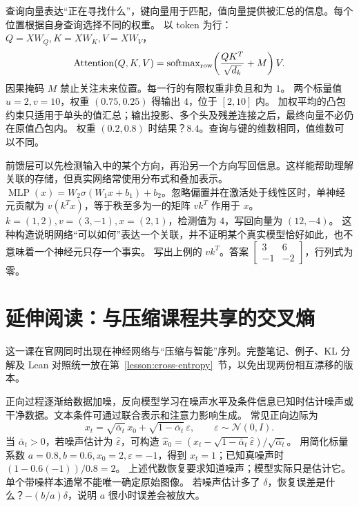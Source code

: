 \idea 查询向量表达“正在寻找什么”，键向量用于匹配，值向量提供被汇总的信息。每个位置根据自身查询选择不同的权重。
\mathpart 以 token 为行：$Q=XW_Q,K=XW_K,V=XW_V$，
\[\operatorname{Attention}(Q,K,V)=\operatorname{softmax}_{\rm row}\!\left(\frac{QK^T}{\sqrt{d_k}}+M\right)V.\]
因果掩码 $M$ 禁止关注未来位置。每一行的有限权重非负且和为 $1$。
\examplepart 两个标量值 $u=2,v=10$，权重 $(0.75,0.25)$ 得输出 $4$，位于 $[2,10]$ 内。
\pitfall 加权平均的凸包约束只适用于单头的值汇总；输出投影、多个头及残差连接之后，最终向量不必仍在原值凸包内。
\exercise 权重 $(0.2,0.8)$ 时结果？$8.4$。查询与键的维数相同，值维数可以不同。
\nextlesson

\idea 前馈层可以先检测输入中的某个方向，再沿另一个方向写回信息。这样能帮助理解关联的存储，但真实网络常使用分布式和叠加表示。
\mathpart $\operatorname{MLP}(x)=W_2\sigma(W_1x+b_1)+b_2$。忽略偏置并在激活处于线性区时，单神经元贡献为 $v(k^Tx)$，等于秩至多为一的矩阵 $vk^T$ 作用于 $x$。
\examplepart $k=(1,2),v=(3,-1),x=(2,1)$，检测值为 $4$，写回向量为 $(12,-4)$。
\pitfall 这种构造说明网络“可以如何”表达一个关联，并不证明某个真实模型恰好如此，也不意味着一个神经元只存一个事实。
\exercise 写出上例的 $vk^T$。答案 $\left[\begin{smallmatrix}3&6\\-1&-2\end{smallmatrix}\right]$，行列式为零。
\nextlesson

\section*{延伸阅读：与压缩课程共享的交叉熵}
这一课在官网同时出现在神经网络与“压缩与智能”序列。完整笔记、例子、KL 分解及 Lean 对照统一放在第~\ref{lesson:cross-entropy}~节，以免出现两份相互漂移的版本。

\idea 正向过程逐渐给数据加噪，反向模型学习在噪声水平及条件信息已知时估计噪声或干净数据。文本条件可通过联合表示和注意力影响生成。
\mathpart 常见正向边际为
\[x_t=\sqrt{\bar\alpha_t}\,x_0+\sqrt{1-\bar\alpha_t}\,\varepsilon,
\qquad\varepsilon\sim\mathcal N(0,I).\]
当 $\bar\alpha_t>0$，若噪声估计为 $\hat\varepsilon$，可构造 $\hat x_0=(x_t-\sqrt{1-\bar\alpha_t}\hat\varepsilon)/\sqrt{\bar\alpha_t}$。
\examplepart 用简化标量系数 $a=0.8,b=0.6,x_0=2,\varepsilon=-1$，得到 $x_t=1$；已知真噪声时 $(1-0.6(-1))/0.8=2$。
\pitfall 上述代数恢复要求知道噪声；模型实际只是估计它。单个带噪样本通常不能唯一确定原始图像。
\exercise 若噪声估计多了 $\delta$，恢复误差是什么？$-(b/a)\delta$，说明 $a$ 很小时误差会被放大。

